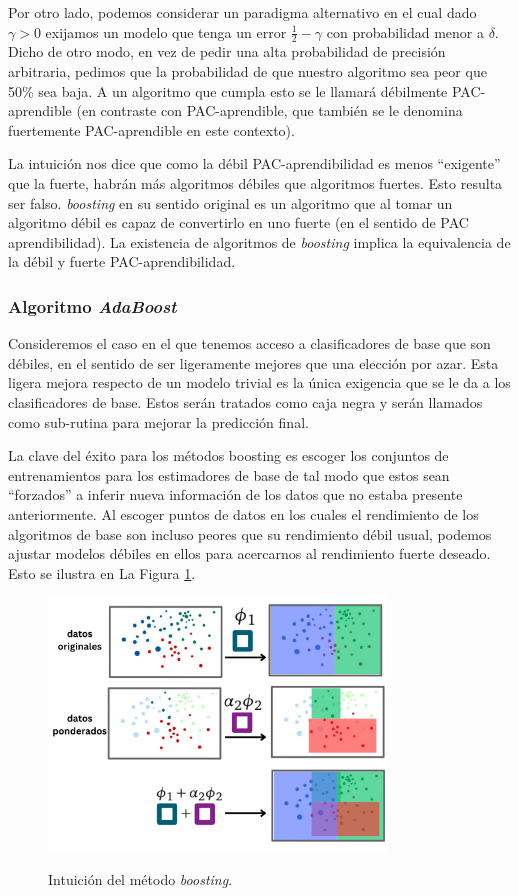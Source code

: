 Por otro lado, podemos considerar un paradigma alternativo en el cual dado $\gamma > 0$ exijamos un modelo que tenga un error $\frac{1}{2} - \gamma$ con probabilidad menor a $\delta$. Dicho de otro modo, en vez de pedir una alta probabilidad de precisión arbitraria, pedimos que la probabilidad de que nuestro algoritmo sea peor que 50\% sea baja. A un algoritmo que cumpla esto se le llamará débilmente PAC-aprendible (en contraste con PAC-aprendible, que también se le denomina fuertemente PAC-aprendible en este contexto).

La intuición nos dice que como la débil PAC-aprendibilidad es menos ``exigente'' que la fuerte, habrán más algoritmos débiles que algoritmos fuertes. Esto resulta ser falso. \textit{boosting} en su sentido original es un algoritmo que al tomar un algoritmo débil es capaz de convertirlo en uno fuerte (en el sentido de PAC aprendibilidad). La existencia de algoritmos de \textit{boosting} implica la equivalencia de la débil y fuerte PAC-aprendibilidad.


\subsubsection{Algoritmo \textit{AdaBoost}}

Consideremos el caso en el que tenemos acceso a clasificadores de base que son débiles, en el sentido de ser ligeramente mejores que una elección por azar. Esta ligera mejora respecto de un modelo trivial es la única exigencia que se le da a los clasificadores de base. Estos serán tratados como caja negra y serán llamados como sub-rutina para mejorar la predicción final.

La clave del éxito para los métodos boosting es escoger los conjuntos de entrenamientos para los estimadores de base de tal modo que estos sean ``forzados'' a inferir nueva información de los datos que no estaba presente anteriormente. Al escoger puntos de datos en los cuales el rendimiento de los algoritmos de base son incluso peores que su rendimiento débil usual, podemos ajustar modelos débiles en ellos para acercarnos al rendimiento fuerte deseado. Esto se ilustra en La Figura \ref{fig:idea_boosting}.

\begin{figure}[h]
    \centering
    \includegraphics[width=0.8\textwidth]{img/CapN_idea_boosting.png}\\
    \caption{Intuición del método \textit{boosting}.}
    \label{fig:idea_boosting}
\end{figure}

